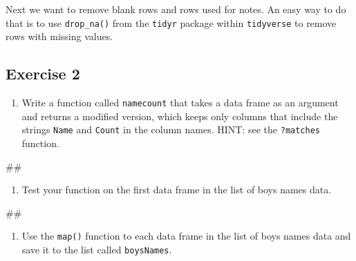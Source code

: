 \documentclass[]{book}
\newenvironment{Shaded}{\begin{snugshade}}{\end{snugshade}}
\newcommand{\KeywordTok}[1]{\textcolor[rgb]{0.13,0.29,0.53}{\textbf{#1}}}
\newcommand{\DecValTok}[1]{\textcolor[rgb]{0.00,0.00,0.81}{#1}}
\newcommand{\StringTok}[1]{\textcolor[rgb]{0.31,0.60,0.02}{#1}}
\newcommand{\OperatorTok}[1]{\textcolor[rgb]{0.81,0.36,0.00}{\textbf{#1}}}
\newcommand{\NormalTok}[1]{#1}
\providecommand{\tightlist}{%
  \setlength{\itemsep}{0pt}\setlength{\parskip}{0pt}}
\begin{document}
Next we want to remove blank rows and rows used for notes. An easy way
to do that is to use \texttt{drop\_na()} from the \texttt{tidyr} package
within \texttt{tidyverse} to remove rows with missing values.

\begin{Shaded}
\end{Shaded}

\subsection{Exercise 2}\label{exercise-2-2}

\begin{enumerate}
\def\labelenumi{\arabic{enumi}.}
\tightlist
\item
  Write a function called \texttt{namecount} that takes a data frame as
  an argument and returns a modified version, which keeps only columns
  that include the strings \texttt{Name} and \texttt{Count} in the
  column names. HINT: see the \texttt{?matches} function.
\end{enumerate}

\begin{Shaded}
\begin{Highlighting}[]
\NormalTok{## }
\end{Highlighting}
\end{Shaded}

\begin{enumerate}
\def\labelenumi{\arabic{enumi}.}
\setcounter{enumi}{1}
\tightlist
\item
  Test your function on the first data frame in the list of boys names
  data.
\end{enumerate}

\begin{Shaded}
\begin{Highlighting}[]
\NormalTok{## }
\end{Highlighting}
\end{Shaded}

\begin{enumerate}
\def\labelenumi{\arabic{enumi}.}
\setcounter{enumi}{2}
\tightlist
\item
  Use the \texttt{map()} function to each data frame in the list of boys
  names data and save it to the list called \texttt{boysNames}.
\end{enumerate}
\end{document}

